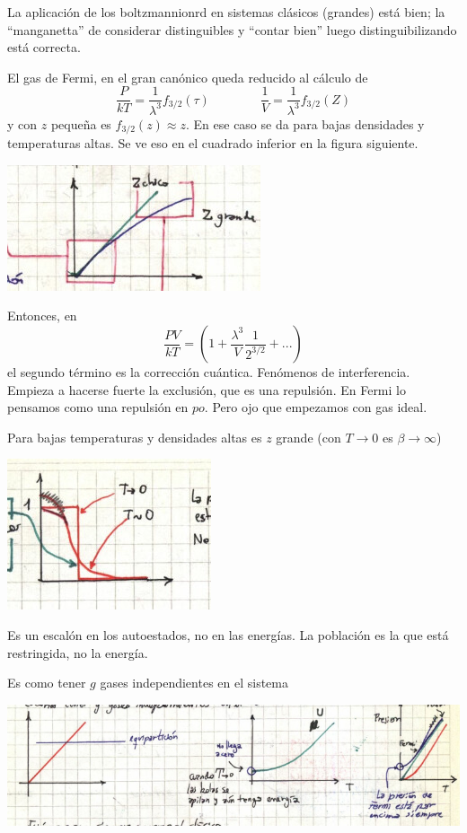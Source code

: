 \documentclass[10pt,oneside]{CBFT_book}
\begin{document}
La aplicación de los boltzmannionrd en sistemas clásicos (grandes) está bien; la ``manganetta''
de considerar distinguibles y ``contar bien'' luego distinguibilizando está correcta.

El gas de Fermi, en el gran canónico queda reducido al cálculo de
\[
	\frac{P}{kT} = \frac{1}{ \lambda^3} f_{3/2}(\tau) \qquad \qquad 
	\frac{1}{V} = \frac{1}{ \lambda^3} f_{3/2}(Z)
\]
y con $z$ pequeña es $ f_{3/2}(z) \approx z$. En ese caso se da para bajas densidades y temperaturas
altas. Se ve eso en el cuadrado inferior en la figura siguiente.

\includegraphics[scale=0.5]{images/1606329509.jpg}


Entonces, en
\[
	\frac{PV}{kT} = \left( 1 + \frac{\lambda^3}{V} \frac{1}{2^{3/2}}+ ... \right)
\]
el segundo término es la corrección cuántica. Fenómenos de interferencia. Empieza a hacerse fuerte la
exclusión, que es una repulsión. En Fermi lo pensamos como una repulsión en $po$. Pero ojo que empezamos
con gas ideal.

Para bajas temperaturas y densidades altas es $z$ grande (con $T \to 0$ es $\beta \to \infty$)

\includegraphics[scale=0.5]{images/1606329514.jpg}

Es un escalón en los autoestados, no en las energías. La población es la que está restringida, no la
energía.

Es como tener $g$ gases independientes en el sistema

\includegraphics[scale=0.4]{images/1606329518.jpg}
\end{document}
